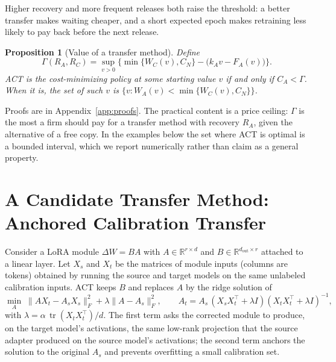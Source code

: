 \documentclass[preprint,12pt,authoryear]{elsarticle}
\newtheorem{proposition}{Proposition}
\begin{document}
Higher recovery and more frequent releases both raise the threshold: a better transfer makes waiting cheaper,
and a short expected epoch makes retraining less likely to pay back before the next release.

\begin{proposition}[Value of a transfer method]\label{prop:act}
Define
\begin{equation}
\Gamma(R_A,R_C)=\sup_{v>0}\Big\{\min\{W_C(v),C_N\}-\big(k_Av-F_A(v)\big)\Big\}.
\end{equation}
ACT is the cost-minimizing policy at some starting value $v$ if and only if $C_A<\Gamma$. When it is, the set of such
$v$ is $\{v: W_A(v)<\min\{W_C(v),C_N\}\}$.
\end{proposition}

Proofs are in Appendix~\ref{app:proofs}. The practical content is a price ceiling: $\Gamma$ is the most a firm should
pay for a transfer method with recovery $R_A$, given the alternative of a free copy. In the examples below the
set where ACT is optimal is a bounded interval, which we report numerically rather than claim as a general property.

\section{A Candidate Transfer Method: Anchored Calibration Transfer}\label{sec:act}

Consider a LoRA module $\Delta W=BA$ with $A\in\mathbb R^{r\times d}$ and $B\in\mathbb R^{d_{\text{out}}\times r}$ attached to a
linear layer. Let $X_s$ and $X_t$ be the matrices of module inputs (columns are tokens) obtained by running the source
and target models on the same unlabeled calibration inputs. ACT keeps $B$ and replaces $A$ by the ridge solution of
\begin{equation}
\min_{A}\;\|AX_t-A_sX_s\|_F^2+\lambda\|A-A_s\|_F^2,\qquad
A_t=A_s\,(X_sX_t^{\top}+\lambda I)(X_tX_t^{\top}+\lambda I)^{-1},
\end{equation}
with $\lambda=\alpha\,\operatorname{tr}(X_tX_t^{\top})/d$. The first term asks the corrected module to produce, on the
target model's activations, the same low-rank projection that the source adapter produced on the source model's
activations; the second term anchors the solution to the original $A_s$ and prevents overfitting a small calibration
set.
\end{document}

